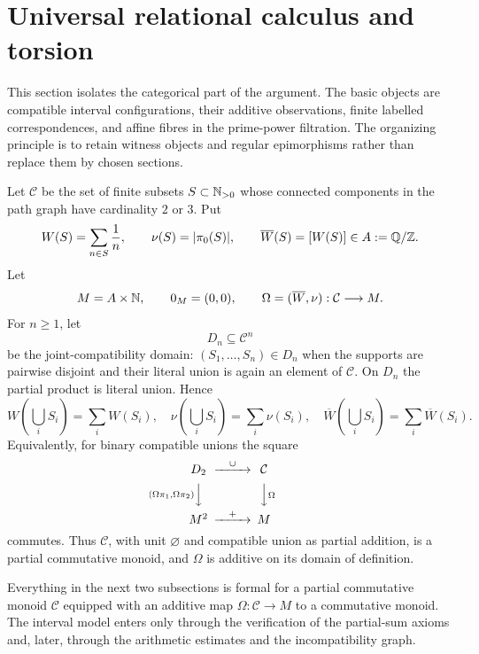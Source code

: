 \section{Universal relational calculus and torsion}
\label{sec:states-filtration}

This section isolates the categorical part of the argument.  The basic objects are compatible interval configurations, their additive observations, finite labelled correspondences, and affine fibres in the prime-power filtration.  The organizing principle is to retain witness objects and regular epimorphisms rather than replace them by chosen sections.

Let $\mathcal C$ be the set of finite subsets $S\subset\mathbb N_{>0}$ whose connected components in the path graph have cardinality $2$ or $3$.  Put
\begin{equation}\label{eq:observations}
W(S)=\sum_{n\in S}\frac1n,
\qquad
\nu(S)=|\pi_0(S)|,
\qquad
\overline W(S)=[W(S)]\in A:=\mathbb Q/\mathbb Z.
\end{equation}
Let
\[
M=A\times\mathbb N,
\qquad
0_M=(0,0),
\qquad
\Omega=(\overline W,\nu):\mathcal C\longrightarrow M.
\]
For $n\ge1$, let
\[
D_n\subseteq\mathcal C^n
\]
be the joint-compatibility domain: $(S_1,\ldots,S_n)\in D_n$ when the supports are pairwise disjoint and their literal union is again an element of $\mathcal C$.  On $D_n$ the partial product is literal union.  Hence
\begin{equation}\label{eq:additive-observations}
W\!\left(\bigcup_iS_i\right)=\sum_iW(S_i),
\quad
\nu\!\left(\bigcup_iS_i\right)=\sum_i\nu(S_i),
\quad
\overline W\!\left(\bigcup_iS_i\right)=\sum_i\overline W(S_i).
\end{equation}
Equivalently, for binary compatible unions the square
\begin{equation}\label{eq:observation-square}
\begin{CD}
D_2 @>{\cup}>> \mathcal C\\
@V{(\Omega\pi_1,\Omega\pi_2)}VV @VV{\Omega}V\\
M^2 @>{+}>> M
\end{CD}
\end{equation}
commutes.  Thus $\mathcal C$, with unit $\varnothing$ and compatible union as partial addition, is a partial commutative monoid, and $\Omega$ is additive on its domain of definition.

\begin{remark}\label{rem:abstract-labelled-relations}
Everything in the next two subsections is formal for a partial commutative monoid $\mathscr C$ equipped with an additive map $\Omega:\mathscr C\to M$ to a commutative monoid.  The interval model enters only through the verification of the partial-sum axioms and, later, through the arithmetic estimates and the incompatibility graph.
\end{remark}


